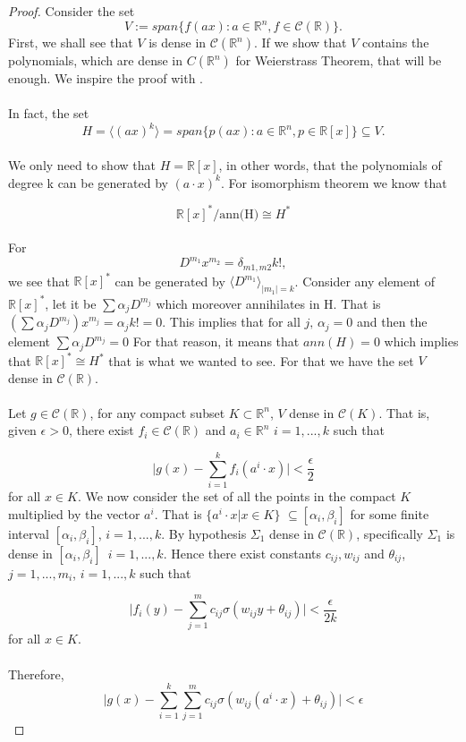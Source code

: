\documentclass[../main.tex]{subfiles}
\begin{document}
	\begin{proof} %
			Consider the set $$V:= span\{ f(ax) : a \in \mathbb{R}^n, f \in \mathcal{C}(\mathbb{R}) \}.$$ First, we shall see that $V$ is dense in $\mathcal{C}(\mathbb{R}^n)$.  If we show that $V$ contains the polynomials, which are dense in $C(\mathbb{R}^n)$ for Weierstrass Theorem, that will be enough. We inspire the proof with \cite{chui_approximation}. \\ \\
			\noindent In fact, the set $$ H = \langle (a x)^k\rangle = span\{ p(ax) : a \in \mathbb{R}^n, p \in \mathbb{R}[x] \} \subseteq V.$$ \\
			We only need to show that $H=\mathbb{R}[x]$, in other words, that the polynomials of degree k can be generated by $(a\cdot x)^k$. For isomorphism theorem we know that
			
			 $$\mathbb{R}[x]^*/\text{ann(H)}\cong H^*$$
			 \\ 
			 For $$D^{m_1} x^{m_2}= \delta_{m1,m2}k!, $$ we see that $\mathbb{R}[x]^*$ can be generated by $\langle D^{m_1}\rangle _{|m_1|=k}$. Consider any element of $\mathbb{R}[x]^*$, let it be $\sum \alpha_j D^{m_j}$ which moreover annihilates in H. That is $(\sum \alpha_j D^{m_j} ) x^{m_j}=\alpha_j k! = 0$. This implies that $\text{for all } j,\, \alpha_j =0$ and then the element $\sum \alpha_j D^{m_j}=0$
			 For that reason, it means that $ann(H)=0$ which implies that $\mathbb{R}[x]^*\cong H^*$ that is what we wanted to see. For that we have the set $V$ dense in $\mathcal{C}(\mathbb{R})$.
			\\ \\ 
			\noindent Let $g\in \mathcal{C}(\mathbb{R}) $, for any compact subset $K \subset \mathbb{R}^n  $, $V$ dense in $\mathcal{C}(K)$. That is, given $\epsilon >0$, there exist $f_i\in  \mathcal{C}(\mathbb{R})$ and $a_i \in \mathbb{R}^n $    {\scriptsize $i=1,...,k$}  such that
			
			$$ \big| g(x)-\sum_{i=1}^k f_i(a^i \cdot x) \big| < \frac{\epsilon}{2}$$
			for all $x\in K$. We now consider the set of all the points in the compact $K$ multiplied by the vector $a^i$. That is $\{a^i \cdot x | x \in K\}$ $\subseteq[\alpha_i,\beta_i] $ for some finite interval $[\alpha_i,\beta_i]$, $i=1,...,k$. By hypothesis $\Sigma_1 $ dense in $\mathcal{C}(\mathbb{R})$, specifically $\Sigma_1 $ is dense in $[\alpha_i,\beta_i ]$ $ \, i=1,...,k$. Hence there exist constants $c_{ij}, w_{ij}$ and $\theta_{ij}$, $j=1,...,m_i$, $i=1,...,k$ such that 
			
			$$ \big|f_i(y) - \sum_{j=1}^{m} c_{ij} \sigma(w_{ij}y+ \theta_{ij})\big| < \frac{\epsilon}{2k}$$
			for all $x\in K$. \\ \\
			Therefore, 
			$$ \big| g(x) - \sum_{i=1}^k \sum_{j=1}^m c_{ij} \sigma(w_{ij}(a^i \cdot x) + \theta_{ij})  \big| < \epsilon$$
		\end{proof}
\end{document}

